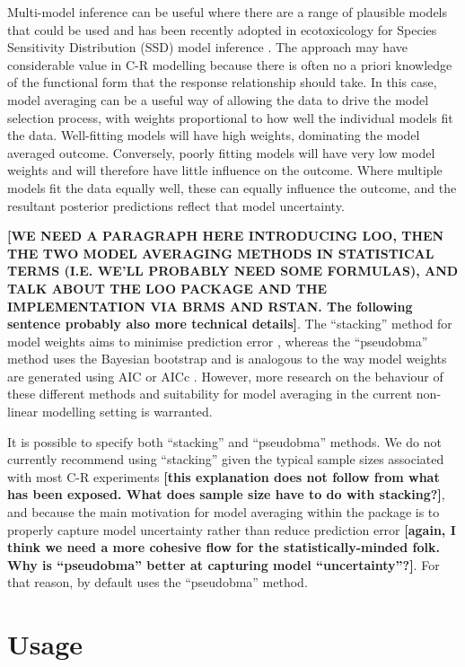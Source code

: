 Multi-model inference can be useful where there are a range of plausible
models that could be used \citep{Burnham2002} and has been recently
adopted in ecotoxicology for Species Sensitivity Distribution (SSD)
model inference \citep{Thorley2018, fox2020, Dalgarno}. The approach may
have considerable value in C-R modelling because there is often no a
priori knowledge of the functional form that the response relationship
should take. In this case, model averaging can be a useful way of
allowing the data to drive the model selection process, with weights
proportional to how well the individual models fit the data.
Well-fitting models will have high weights, dominating the model
averaged outcome. Conversely, poorly fitting models will have very low
model weights and will therefore have little influence on the outcome.
Where multiple models fit the data equally well, these can equally
influence the outcome, and the resultant posterior predictions reflect
that model uncertainty.

\textbf{{[}WE NEED A PARAGRAPH HERE INTRODUCING LOO, THEN THE TWO MODEL
AVERAGING METHODS IN STATISTICAL TERMS (I.E. WE'LL PROBABLY NEED SOME
FORMULAS), AND TALK ABOUT THE LOO PACKAGE AND THE IMPLEMENTATION VIA
BRMS AND RSTAN. The following sentence probably also more technical
details{]}}. The ``stacking'' method for model weights aims to minimise
prediction error \citep{Yao2018}, whereas the ``pseudobma'' method uses
the Bayesian bootstrap \citep{vehtari2020, vehtari2017} and is analogous
to the way model weights are generated using AIC or AICc
\citep{Burnham2002}. However, more research on the behaviour of these
different methods and suitability for model averaging in the current
non-linear modelling setting is warranted.

It is possible to specify both ``stacking'' and ``pseudobma'' methods.
We do not currently recommend using ``stacking'' given the typical
sample sizes associated with most C-R experiments \textbf{{[}this
explanation does not follow from what has been exposed. What does sample
size have to do with stacking?{]}}, and because the main motivation for
model averaging within the  package is to properly capture
model uncertainty rather than reduce prediction error \textbf{{[}again,
I think we need a more cohesive flow for the statistically-minded folk.
Why is ``pseudobma'' better at capturing model ``uncertainty''?{]}}. For
that reason, by default  uses the ``pseudobma'' method.

\hypertarget{usage}{%
\section{Usage}\label{usage}}

